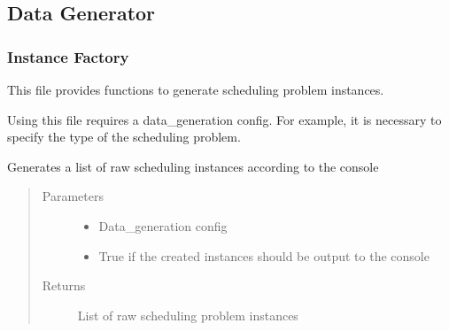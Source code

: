 \documentclass[letterpaper,10pt,english]{sphinxmanual}
\begin{document}
\subsection{Data Generator}
\label{\detokenize{data_generator:data-generator}}\label{\detokenize{data_generator::doc}}

\subsubsection{Instance Factory}
\label{\detokenize{data_generator:module-data_generator.instance_factory}}\label{\detokenize{data_generator:instance-factory}}
\sphinxAtStartPar
This file provides functions to generate scheduling problem instances.

\sphinxAtStartPar
Using this file requires a data\_generation config. For example, it is necessary to specify
the type of the scheduling problem.

\begin{fulllineitems}
\label{\detokenize{data_generator:data_generator.instance_factory.generate_instances_from_config}}
\sphinxAtStartPar
Generates a list of raw scheduling instances according to the console
\begin{quote}\begin{description}
\item[{Parameters}] \leavevmode\begin{itemize}
\item {} 
\sphinxAtStartPar
{} \textendash{} Data\_generation config

\item {} 
\sphinxAtStartPar
{} \textendash{} True if the created instances should be output to the console

\end{itemize}

\item[{Returns}] \leavevmode
\sphinxAtStartPar
List of raw scheduling problem instances

\end{description}\end{quote}

\end{fulllineitems}
\end{document}
